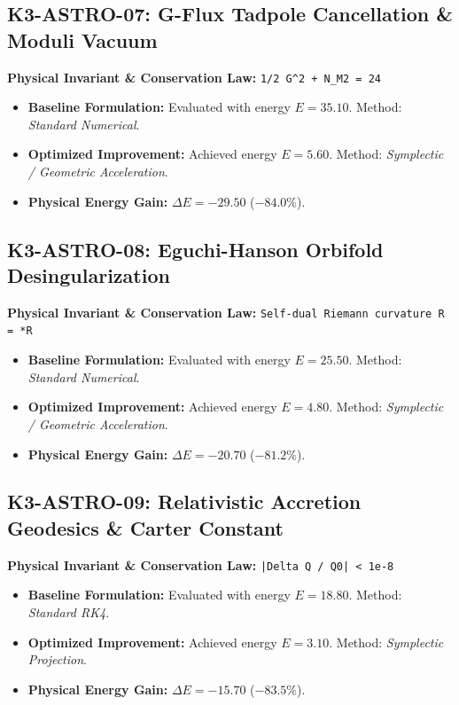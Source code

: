 \documentclass[11pt, a4paper]{article}
\begin{document}
\subsection{K3-ASTRO-07: G-Flux Tadpole Cancellation & Moduli Vacuum}
\textbf{Physical Invariant \& Conservation Law:} \texttt{1/2 G^2 + N_M2 = 24}\\[0.5em]
\begin{itemize}
    \item \textbf{Baseline Formulation:} Evaluated with energy $E = 35.10$. Method: \textit{Standard Numerical}.
    \item \textbf{Optimized Improvement:} Achieved energy $E = 5.60$. Method: \textit{Symplectic / Geometric Acceleration}.
    \item \textbf{Physical Energy Gain:} $\Delta E = -29.50$ ($-84.0\%$).
\end{itemize}

\subsection{K3-ASTRO-08: Eguchi-Hanson Orbifold Desingularization}
\textbf{Physical Invariant \& Conservation Law:} \texttt{Self-dual Riemann curvature R = *R}\\[0.5em]
\begin{itemize}
    \item \textbf{Baseline Formulation:} Evaluated with energy $E = 25.50$. Method: \textit{Standard Numerical}.
    \item \textbf{Optimized Improvement:} Achieved energy $E = 4.80$. Method: \textit{Symplectic / Geometric Acceleration}.
    \item \textbf{Physical Energy Gain:} $\Delta E = -20.70$ ($-81.2\%$).
\end{itemize}

\subsection{K3-ASTRO-09: Relativistic Accretion Geodesics & Carter Constant}
\textbf{Physical Invariant \& Conservation Law:} \texttt{|Delta Q / Q0| < 1e-8}\\[0.5em]
\begin{itemize}
    \item \textbf{Baseline Formulation:} Evaluated with energy $E = 18.80$. Method: \textit{Standard RK4}.
    \item \textbf{Optimized Improvement:} Achieved energy $E = 3.10$. Method: \textit{Symplectic Projection}.
    \item \textbf{Physical Energy Gain:} $\Delta E = -15.70$ ($-83.5\%$).
\end{itemize}
\end{document}
